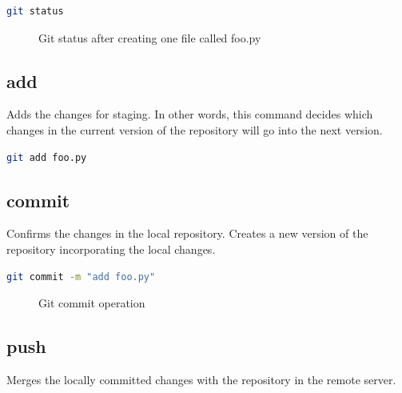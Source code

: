 \documentclass[letterpaper]{article}
\begin{document}
\begin{lstlisting}[language=Bash]
git status
\end{lstlisting}

\begin{figure}[h]
    \centering
    \caption{Git status after creating one file called foo.py}
  \end{figure}


\subsection{add}
Adds the changes for staging. In other words, this command decides which changes in the current version of the repository will go into the next version.
\begin{lstlisting}[language=Bash]
git add foo.py
\end{lstlisting}

\subsection{commit}
Confirms the changes in the local repository. Creates a new version of the repository incorporating the local changes.

\begin{lstlisting}[language=Bash]
git commit -m "add foo.py"
\end{lstlisting}

\begin{figure}[h]
    \centering
    \caption{Git commit operation}
  \end{figure}


\subsection{push}
Merges the locally committed changes with the repository in the remote server.
\end{document}

